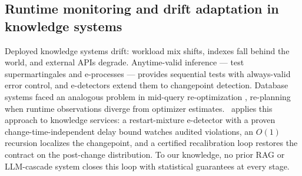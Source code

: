 \subsection{Runtime monitoring and drift adaptation in knowledge systems}
Deployed knowledge systems drift: workload mix shifts, indexes fall
behind the world, and external APIs degrade. Anytime-valid inference
--- test supermartingales and e-processes
\citep{ville1939etude,shafer2021testing,ramdas2023savi,
waudbysmith2024betting,grunwald2024safe}
--- provides
sequential tests with always-valid error control, and e-detectors
\citep{shin2024edetectors} extend them to changepoint detection.
Database systems faced an analogous problem in mid-query
re-optimization \citep{kabra1998efficient,markl2004robust,deng2007spc}, re-planning
when runtime observations diverge from optimizer estimates. \system\
applies this approach to knowledge services: a restart-mixture
e-detector with a proven change-time-independent delay bound watches
audited violations, an $O(1)$ recursion localizes the changepoint, and
a certified recalibration loop restores the contract on the post-change
distribution. To our knowledge, no prior RAG or LLM-cascade system
closes this loop with statistical guarantees at every stage.
